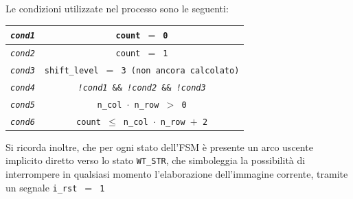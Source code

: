 \documentclass{article}
\begin{document}
Le condizioni utilizzate nel processo sono le seguenti:

\begin{center}
    \begin{tabular}{||c|c||}
        \hline
        \texttt{\emph{cond1}} & \texttt{count $=$ 0} \\
        \hline
        \texttt{\emph{cond2}} & \texttt{count $=$ 1} \\
        \hline
        \texttt{\emph{cond3}} & \texttt{shift\_level $=$ 3 (non ancora calcolato)} \\
        \hline
        \texttt{\emph{cond4}} & \texttt{\emph{!cond1} \&\& \emph{!cond2} \&\& \emph{!cond3}} \\   
        \hline
        \texttt{\emph{cond5}} & \texttt{n\_col $\cdot$ n\_row $>$ 0} \\
        \hline
        \texttt{\emph{cond6}} & \texttt{count $\leq$ n\_col $\cdot$ n\_row $+$ 2} \\      
        \hline
        \end{tabular}
\end{center}

Si ricorda inoltre, che per ogni stato dell'FSM è presente un arco uscente implicito diretto verso lo stato \texttt{WT\_STR}, 
che simboleggia la possibilità di interrompere in qualsiasi momento l'elaborazione dell'immagine corrente, tramite un segnale \texttt{i\_rst $=$ 1}
\end{document}
